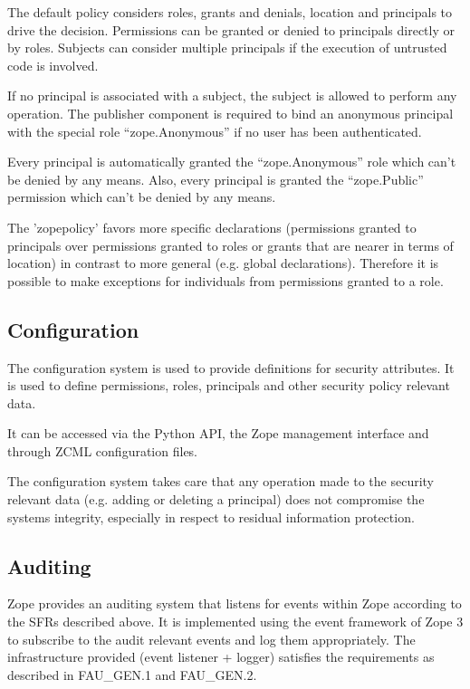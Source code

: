 \documentclass[12pt,english]{scrbook}
\begin{document}
The default policy considers roles, grants and denials, location and principals
to drive the decision. Permissions can be granted or denied to principals
directly or by roles.  Subjects can consider multiple principals if the
execution of untrusted code is involved.

If no principal is associated with a subject, the subject is allowed to perform
any operation. The publisher component is required to bind an anonymous
principal with the special role ``zope.Anonymous'' if no user has been
authenticated.

Every principal is automatically granted the ``zope.Anonymous'' role which can't be
denied by any means. Also, every principal is granted the ``zope.Public''
permission which can't be denied by any means.

The 'zopepolicy' favors more specific declarations (permissions granted to
principals over permissions granted to roles or grants that are nearer in terms
of location) in contrast to more general (e.g. global declarations). Therefore
it is possible to make exceptions for individuals from permissions granted to a
role.




\subsection{Configuration}

The configuration system is used to provide definitions for security
attributes. It is used to define permissions, roles, principals and other
security policy relevant data.

It can be accessed via the Python API, the Zope management interface and
through ZCML configuration files.

The configuration system takes care that any operation made to the security
relevant data (e.g. adding or deleting a principal) does not compromise the
systems integrity, especially in respect to residual information protection.

\subsection{Auditing}

Zope provides an auditing system that listens for events within Zope according
to the SFRs described above. It is implemented using the event framework of
Zope 3 to subscribe to the audit relevant events and log them appropriately.
The infrastructure provided (event listener + logger) satisfies the
requirements as described in FAU{\_}GEN.1 and FAU{\_}GEN.2.
\end{document}
